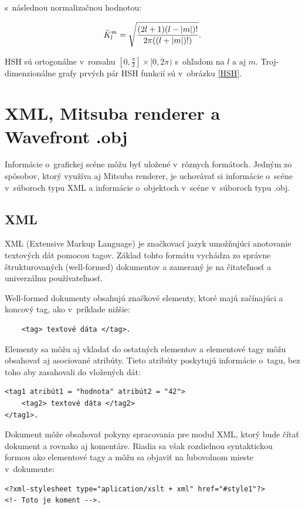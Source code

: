 \noindent s~následnou normalizačnou hodnotou:

\begin{equation} \label{HSHA2}
    \Tilde{K}_l^m = \sqrt{\frac{(2l+1)(l-| m |)!}{2\pi((l+|m|)!)}}.
\end{equation}

HSH sú ortogonálne v~rozsahu $[0,\frac{\pi}{2}] \times [0,2\pi)$ s~ohľadom na $l \text{ a aj } m$. Troj-dimenzionálne grafy prvých pár HSH funkcií sú v~obrázku \ref{HSH}.

\section{XML, Mitsuba renderer a Wavefront .obj}
\label{Vstup}
Informácie o~grafickej scéne môžu byť uložené v~rôznych formátoch. Jedným zo spôsobov, ktorý využíva aj Mitsuba renderer, je uchovávať si informácie o~scéne v~súboroch typu XML a informácie o~objektoch v~scéne v~súboroch typu .obj.

\subsection*{XML}
XML (Extensive Markup Language) \cite{XML} je značkovací jazyk umožňujúci anotovanie textových dát pomocou tagov. Základ tohto formátu vychádza zo správne štrukturovaných (well-formed) dokumentov a zameraný je na čitateľnosť a univerzálnu používateľnosť.

Well-formed dokumenty obsahujú značkové elementy, ktoré majú začínajúci a koncový tag, ako v~príklade nižšie:

\begin{verbatim}
    <tag> textové dáta </tag>.
\end{verbatim}

Elementy sa môžu aj vkladať do ostatných elementov a elementové tagy môžu obsahovať aj asociované atribúty. Tieto atribúty poskytujú informácie o~tagu, bez toho aby zasahovali do vložených dát:

\begin{verbatim}
<tag1 atribút1 = "hodnota" atribút2 = "42">
    <tag2> textové dáta </tag2>
</tag1>.
\end{verbatim}

Dokument môže obsahovať pokyny spracovania pre modul XML, ktorý bude čítať dokument a rovnako aj komentáre. Riadia sa však rozdielnou syntaktickou formou ako elementové tagy a môžu sa objaviť na ľubovolnom mieste v~dokumente:

\begin{verbatim}
<?xml-stylesheet type="aplication/xslt + xml" href="#style1"?>
<!- Toto je koment -->.
\end{verbatim}

